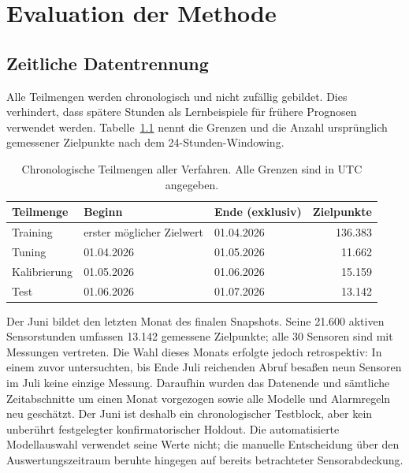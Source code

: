 \chapter{Evaluation der Methode}
\label{ch:EvaluationDerMethode}

\section{Zeitliche Datentrennung}

Alle Teilmengen werden chronologisch und nicht zufällig gebildet. Dies
verhindert, dass spätere Stunden als Lernbeispiele für frühere Prognosen
verwendet werden. Tabelle~\ref{tab:forecaster_splits} nennt die Grenzen und die
Anzahl ursprünglich gemessener Zielpunkte nach dem 24-Stunden-Windowing.

\begin{table}[htb]
  \centering
  \caption{Chronologische Teilmengen aller Verfahren. Alle Grenzen sind in UTC
    angegeben.}
  \label{tab:forecaster_splits}
  \begin{tabular}{lll r}
    \hline
    Teilmenge & Beginn & Ende (exklusiv) & Zielpunkte \\
    \hline
    Training & erster möglicher Zielwert & 01.04.2026 & 136.383 \\
    Tuning & 01.04.2026 & 01.05.2026 & 11.662 \\
    Kalibrierung & 01.05.2026 & 01.06.2026 & 15.159 \\
    Test & 01.06.2026 & 01.07.2026 & 13.142 \\
    \hline
  \end{tabular}
\end{table}

Der Juni bildet den letzten Monat des finalen Snapshots. Seine 21.600 aktiven
Sensorstunden umfassen 13.142 gemessene Zielpunkte; alle 30 Sensoren sind mit
Messungen vertreten. Die Wahl dieses Monats erfolgte jedoch retrospektiv: In
einem zuvor untersuchten, bis Ende Juli reichenden Abruf besaßen neun Sensoren
im Juli keine einzige Messung. Daraufhin wurden das Datenende und sämtliche
Zeitabschnitte um einen Monat vorgezogen sowie alle Modelle und Alarmregeln neu
geschätzt. Der Juni ist deshalb ein chronologischer Testblock,
aber kein unberührt festgelegter konfirmatorischer Holdout. Die automatisierte
Modellauswahl verwendet seine Werte nicht; die manuelle Entscheidung über
den Auswertungszeitraum beruhte hingegen auf bereits betrachteter
Sensorabdeckung.

